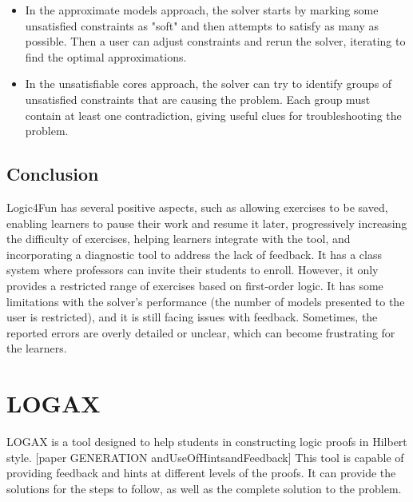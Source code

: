 \begin{itemize}

    \item In the approximate models approach, the solver starts by marking some unsatisfied constraints as "soft" and then attempts to satisfy as many as possible. Then a user can adjust constraints and rerun the solver, iterating to find the optimal approximations.

    \item In the unsatisfiable cores approach, the solver can try to identify groups of unsatisfied constraints that are causing the problem. Each group must contain at least one contradiction, giving useful clues for troubleshooting the problem. 

\end{itemize}

\subsection{Conclusion}

Logic4Fun has several positive aspects, such as allowing exercises to be saved, enabling learners to pause their work and resume it later, progressively increasing the difficulty of exercises, helping learners integrate with the tool, and incorporating a diagnostic tool to address the lack of feedback. It has a class system where professors can invite their students to enroll. However, it only provides a restricted range of exercises based on first-order logic. It has some limitations with the solver's performance (the number of models presented to the user is restricted), and it is still facing issues with feedback. Sometimes, the reported errors are overly detailed or unclear, which can become frustrating for the learners.

\section{LOGAX}

LOGAX is a tool designed to help students in constructing logic proofs in Hilbert style. [paper GENERATION andUseOfHintsandFeedback] This tool is capable of providing feedback and hints at different levels of the proofs. It can provide the solutions for the steps to follow, as well as the complete solution to the problem.

